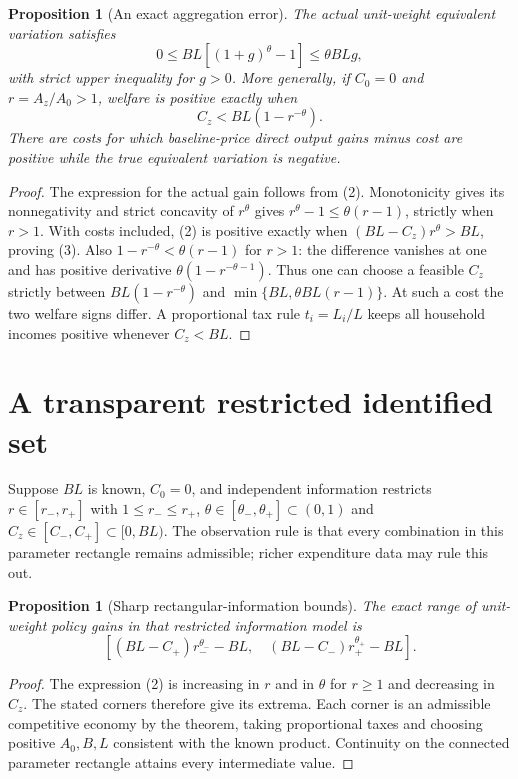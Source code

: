 \documentclass[11pt,a4paper]{article}
\newtheorem{proposition}[theorem]{Proposition}
\theoremstyle{definition}
\theoremstyle{remark}
\begin{document}
\begin{proposition}[An exact aggregation error]
The actual unit-weight equivalent variation satisfies
\[
 0\leq BL[(1+g)^\theta-1]\leq\theta BLg,
\]
with strict upper inequality for $g>0$. More generally, if $C_0=0$ and $r=A_z/A_0>1$, welfare is positive exactly when
\[
 C_z<BL(1-r^{-\theta}).\tag{3}
\]
There are costs for which baseline-price direct output gains minus cost are positive while the true equivalent variation is negative.
\end{proposition}
\begin{proof}
The expression for the actual gain follows from (2). Monotonicity gives its nonnegativity and strict concavity of $r^\theta$ gives $r^\theta-1\leq\theta(r-1)$, strictly when $r>1$. With costs included, (2) is positive exactly when $(BL-C_z)r^\theta>BL$, proving (3). Also $1-r^{-\theta}<\theta(r-1)$ for $r>1$: the difference vanishes at one and has positive derivative $\theta(1-r^{-\theta-1})$. Thus one can choose a feasible $C_z$ strictly between $BL(1-r^{-\theta})$ and $\min\{BL,\theta BL(r-1)\}$. At such a cost the two welfare signs differ. A proportional tax rule $t_i=L_i/L$ keeps all household incomes positive whenever $C_z<BL$.
\end{proof}

\section{A transparent restricted identified set}
Suppose $BL$ is known, $C_0=0$, and independent information restricts $r\in[r_-,r_+]$ with $1\leq r_-\leq r_+$, $\theta\in[\theta_-,\theta_+]\subset(0,1)$ and $C_z\in[C_-,C_+]\subset[0,BL)$. The observation rule is that every combination in this parameter rectangle remains admissible; richer expenditure data may rule this out.

\begin{proposition}[Sharp rectangular-information bounds]
The exact range of unit-weight policy gains in that restricted information model is
\[
 \left[(BL-C_+)r_-^{\theta_-}-BL,\quad
       (BL-C_-)r_+^{\theta_+}-BL\right].
\]
\end{proposition}
\begin{proof}
The expression (2) is increasing in $r$ and in $\theta$ for $r\geq1$ and decreasing in $C_z$. The stated corners therefore give its extrema. Each corner is an admissible competitive economy by the theorem, taking proportional taxes and choosing positive $A_0,B,L$ consistent with the known product. Continuity on the connected parameter rectangle attains every intermediate value.
\end{proof}
\end{document}
